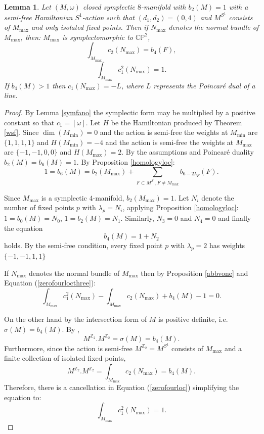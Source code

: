 \documentclass[12pt]{article}
\newtheorem{lemma}[theorem]{Lemma}
\begin{document}
\begin{lemma} \label{zerofourcaseone}
Let $(M,\omega)$  closed symplectic $8$-manifold with $b_{2}(M)=1$ with a semi-free Hamiltonian $S^1$-action such that $(d_1,d_2)=(0,4)$ and $M^{S^1}$ consists of $M_{\max}$ and only isolated fixed points. Then if $N_{\max}$ denotes the normal bundle of $M_{\max}$, then: $M_{\max}$ is symplectomorphic to $\mathbb{CP}^2$, $$\int_{M_{\max}}c_{2}(N_{\max}) = b_{4}(F),$$ $$  \int_{M_{\max}} c_{1}^2(N_{\max})  = 1. $$ If $b_{4}(M)>1$ then $c_{1}(N_{\max})=-L$, where $L$ represents the Poincar\'{e} dual of a line. 
\end{lemma}
\begin{proof}


By Lemma \ref{symfano} the symplectic form may be multiplied by a positive constant so that $c_1 = [\omega]$. Let $H$ be the Hamiltonian produced by Theorem \ref{wsf}. Since $\dim(M_{\min}) = 0$ and the action is semi-free the weights at $M_{\min}$ are $\{1,1,1,1\}$ and $H(M_{\min}) = -4$ and the action is semi-free the weights at $M_{\max}$ are $\{-1,-1,0,0\}$  and $H(M_{\max}) = 2$. By the assumptions and Poincar\'{e} duality $b_{2}(M)=b_{6}(M)=1$. By Proposition \ref{homologyloc}:
\begin{equation} \label{zerofourloctwo}  
1= b_{6}(M) = b_{2}(M_{\max}) +  \sum_{F \subset M^{S^1}, F \neq M_{\max}} b_{6-2\lambda_{F}}(F).  \end{equation}

Since $M_{\max}$ is a symplectic $4$-manifold, $b_{2}(M_{\max})=1$. Let $N_{i}$ denote the number of fixed points $p$ with $\lambda_{p} = N_{i}$, applying Proposition \ref{homologyloc}:  $1=b_{0}(M)=N_{0}$, $1 = b_{2}(M)= N_{1}$. Similarly, $N_{3}=0$ and $N_{4}=0$ and finally the equation \begin{equation} \label{zerofourlocthree}  
 b_{4}(M) = 1 + N_{2}  \end{equation} holds. By the semi-free condition, every fixed point $p$ with $\lambda_{p} = 2$ has weights $\{-1,-1,1,1\}$

 If $N_{\max}$ denotes the normal bundle of  $M_{\max}$ then by Proposition \ref{abbvone} and Equation (\ref{zerofourlocthree}):  \begin{equation}\label{zerofourloc} \int_{M_{\max}} c_{1}^2(N_{\max}) - \int_{M_{\max}} c_{2}(N_{\max}) + b_{4}(M) -1 = 0. \end{equation}

On the other hand by \cite[Theorem 3.4]{L2} the intersection form of $M$ is positive definite, i.e. $\sigma(M) = b_{4}(M)$. By \cite[Main Result]{JO}, $$M^{\mathbb{Z}_2}.M^{\mathbb{Z}_2} = \sigma(M) = b_{4}(M). $$ Furthermore,  since the action is semi-free $M^{\mathbb{Z}_2} =M^{S^1}$ consists of $M_{\max}$ and a finite collection of isolated fixed points, $$M^{\mathbb{Z}_2}.M^{\mathbb{Z}_2} = \int_{M_{\max}} c_{2}(N_{\max}) = b_{4}(M).$$  Therefore, there is a cancellation in Equation (\ref{zerofourloc}) simplifying the equation to:  \begin{equation}\label{zerofourloctwo}   \int_{M_{\max}} c_{1}^2(N_{\max})  = 1.  \end{equation}


\end{proof}
\end{document}
